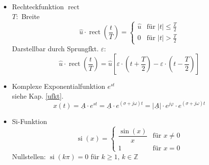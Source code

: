 \begin{mdframed}[style=exercise]
\begin{itemize}[leftmargin=*]
\[          \]
          \item{Rechteckfunktion $\operatorname{rect}$}\\
          $T:$ Breite
          \[ \hat{u} \cdot \operatorname{rect}\left(\frac{t}{T}\right) =
             \begin{cases}
                 \hat{u} & \text{f\"ur } \vert t\rvert \leq \frac{T}{2}\\
                 0 & \text{f\"ur } \vert t\rvert > \frac{T}{2}
             \end{cases}
          \]
          Darstellbar durch Sprungfkt. $\varepsilon$:
          $$\hat{u} \cdot  \operatorname{rect}\left( \frac{t}{T} \right) = \hat{u} \left[  \varepsilon\cdot\left( t+\frac{T}{2} \right)-\varepsilon\cdot\left( t-\frac{T}{2} \right) \right]
          $$
          
          \item{Komplexe Exponentialfunktion $e^{st}$}\\
          siehe Kap. \ref{ufkt}.
          \[ x(t)=\underline{A}\cdot e^{st} = \underline{A}\cdot e^{(\sigma+j\omega)t} = |\underline{A}|\cdot e^{j\varphi} \cdot e^{(\sigma+j\omega)t}
          \]
          \item Si-Funktion
                    \[ \operatorname{si}(x) =
          \begin{cases}
          	\dfrac{\sin(x)}{x} & \text{f\"ur } x\neq 0\\
          	1 & \text{f\"ur } x = 0
          \end{cases}
          \]
          Nullstellen: $\operatorname{si}(k\pi)=0$ für $k\ge1,\, k\in \mathbb{Z}$
      \end{itemize}
  \end{mdframed}
